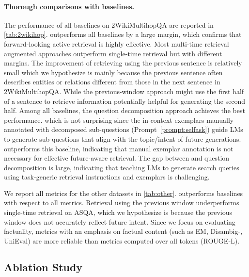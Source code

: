 \paragraph{Thorough comparisons with baselines.}
The performance of all baselines on 2WikiMultihopQA are reported in \autoref{tab:2wikihop}.
\ours outperforms all baselines by a large margin, which confirms that forward-looking active retrieval is highly effective.
Most multi-time retrieval augmented approaches outperform single-time retrieval but with different margins.
The improvement of retrieving using the previous sentence is relatively small which we hypothesize is mainly because the previous sentence often describes entities or relations different from those in the next sentence in 2WikiMultihopQA.
While the previous-window approach might use the first half of a sentence to retrieve information potentially helpful for generating the second half.
Among all baselines, the question decomposition approach \cite{selfask-press-2022} achieves the best performance. which is not surprising since the in-context exemplars manually annotated with decomposed sub-questions (Prompt~\autoref{prompt:selfask}) guide LMs to generate sub-questions that align with the topic/intent of future generations.
\ours outperforms this baseline, indicating that manual exemplar annotation is not necessary for effective future-aware retrieval.
The gap between \oursr and question decomposition is large, indicating that teaching LMs to generate search queries using task-generic retrieval instructions and exemplars is challenging.

We report all metrics for the other datasets in \autoref{tab:other}.
\ours outperforms baselines with respect to all metrics.
Retrieval using the previous window underperforms single-time retrieval on ASQA, which we hypothesize is because the previous window does not accurately reflect future intent.
Since we focus on evaluating factuality, metrics with an emphasis on factual content (such as EM, Disambig-\fone, UniEval) are more reliable than metrics computed over all tokens (ROUGE-L).

\subsection{Ablation Study}\label{sec:exp_ablation}

